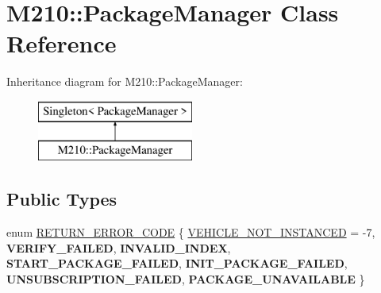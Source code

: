 \hypertarget{class_m210_1_1_package_manager}{}\section{M210\+:\+:Package\+Manager Class Reference}
\label{class_m210_1_1_package_manager}
Inheritance diagram for M210\+:\+:Package\+Manager\+:\begin{figure}[H]
\begin{center}
\leavevmode
\includegraphics[height=2.000000cm]{class_m210_1_1_package_manager}
\end{center}
\end{figure}
\subsection*{Public Types}
\begin{DoxyCompactItemize}
\item 
enum \mbox{\hyperlink{class_m210_1_1_package_manager_a2da6ff8ace580a0081e1412dd874e21d}{R\+E\+T\+U\+R\+N\+\_\+\+E\+R\+R\+O\+R\+\_\+\+C\+O\+DE}} \{ \newline
\mbox{\hyperlink{class_m210_1_1_package_manager_a2da6ff8ace580a0081e1412dd874e21da7ad0fc69b0a18553d576b9a01118921f}{V\+E\+H\+I\+C\+L\+E\+\_\+\+N\+O\+T\+\_\+\+I\+N\+S\+T\+A\+N\+C\+ED}} = -\/7, 
{\bfseries V\+E\+R\+I\+F\+Y\+\_\+\+F\+A\+I\+L\+ED}, 
{\bfseries I\+N\+V\+A\+L\+I\+D\+\_\+\+I\+N\+D\+EX}, 
{\bfseries S\+T\+A\+R\+T\+\_\+\+P\+A\+C\+K\+A\+G\+E\+\_\+\+F\+A\+I\+L\+ED}, 
\newline
{\bfseries I\+N\+I\+T\+\_\+\+P\+A\+C\+K\+A\+G\+E\+\_\+\+F\+A\+I\+L\+ED}, 
{\bfseries U\+N\+S\+U\+B\+S\+C\+R\+I\+P\+T\+I\+O\+N\+\_\+\+F\+A\+I\+L\+ED}, 
{\bfseries P\+A\+C\+K\+A\+G\+E\+\_\+\+U\+N\+A\+V\+A\+I\+L\+A\+B\+LE}
 \}
\end{DoxyCompactItemize}
